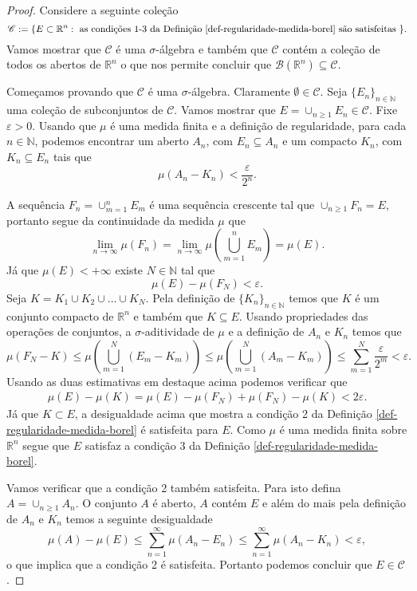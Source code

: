 \begin{proof}
Considere a seguinte coleção 
\[
\mathscr{C}:=
\{
E\subset \mathbb{R}^n: \ 
\text{as condições 1-3 da Definição 
\ref{def-regularidade-medida-borel} são satisfeitas }
\}.
\]
Vamos mostrar que $\mathscr{C}$ é uma $\sigma$-álgebra
e também que $\mathscr{C}$ contém a coleção de todos os 
abertos de $\mathbb{R}^n$ o que nos permite concluir que
$\mathscr{B}(\mathbb{R}^n)\subseteq \mathscr{C}$.


Começamos provando que $\mathscr{C}$ é uma $\sigma$-álgebra.
Claramente $\emptyset\in\mathscr{C}$. 
Seja $\{E_n\}_{n\in\mathbb{N}}$ uma coleção de subconjuntos de
$\mathscr{C}$. Vamos mostrar que $E=\cup_{n\geq 1} E_n\in \mathscr{C}$.
Fixe $\varepsilon>0$. Usando que $\mu$ é uma medida finita 
e a definição de regularidade, 
para cada $n\in\mathbb{N}$, podemos encontrar um aberto 
$A_n$, com $E_n\subseteq A_n$ e um compacto $K_n$, com
$K_n\subseteq E_n$ tais que
\[
\mu(A_n-K_n) < \frac{\varepsilon}{2^n}.
\] 

A sequência $F_n = \cup_{m=1}^n E_m$ é uma sequência
crescente tal que $\cup_{n\geq 1}F_n =E$, portanto
segue da continuidade da medida $\mu$ que
\[
\lim_{n\to\infty} \mu\left(F_n \right)
=
\lim_{n\to\infty} \mu\left(\bigcup_{m=1}^n E_m \right)
=
\mu(E).
\]
Já que $\mu(E)<+\infty$ existe $N\in\mathbb{N}$ tal que 
\[ 
\mu(E)-\mu(F_N)<\varepsilon.
\]
Seja $K=K_1\cup K_2\cup\ldots\cup K_N$. Pela definição de 
$\{K_n\}_{n\in\mathbb{N}}$ temos que $K$ é um conjunto compacto de $\mathbb{R}^n$
e também que $K\subseteq E$. Usando propriedades das operações 
de conjuntos, a $\sigma$-aditividade de $\mu$ e a definição de $A_n$ e $K_n$
temos que 
\[
\mu\left(F_N - K \right)
\leq
\mu\left(\bigcup_{m=1}^N (E_m - K_m)  \right)
\leq
\mu\left(\bigcup_{m=1}^N (A_m - K_m)  \right)
\leq
\sum_{m=1}^N \frac{\varepsilon}{2^m}
<
\varepsilon.
\]
Usando as duas estimativas em destaque acima podemos 
verificar que   
\begin{align*}
\mu(E)-\mu(K)
=
\mu(E)-\mu(F_N)+\mu(F_N)-\mu(K)
<
2\varepsilon.
\end{align*}
Já que $K\subset E$, a desigualdade acima que mostra
a condição 2 da Definição \ref{def-regularidade-medida-borel}
é satisfeita para $E$. Como $\mu$ é uma medida finita sobre
$\mathbb{R}^n$ segue que $E$ satisfaz 
a condição 3 da Definição \ref{def-regularidade-medida-borel}.



Vamos verificar que a condição 2 também satisfeita. 
Para isto defina $A=\cup _{n\geq 1}A_n$. O conjunto $A$
é aberto, $A$ contém $E$ e além do mais pela definição de $A_n$
e $K_n$ temos a seguinte desigualdade 
\[
\mu(A)-\mu(E)
\leq 
\sum_{n=1}^{\infty} \mu(A_n-E_n)
\leq 
\sum_{n=1}^{\infty} \mu(A_n-K_n)
<
\varepsilon,
\]
o que implica que a condição 2 é satisfeita. Portanto 
podemos concluir que $E \in \mathscr{C}$.


\end{proof}
